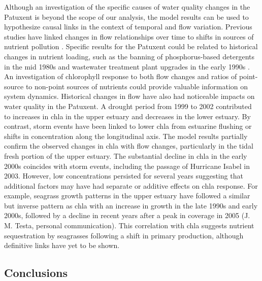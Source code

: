\documentclass[letterpaper,12pt,oneside]{article}\usepackage[]{graphicx}\usepackage[]{color}
\begin{document}
Although an investigation of the specific causes of water quality changes in the Patuxent is beyond the scope of our analysis, the model results can be used to hypothesize causal links in the context of temporal and flow variation.  Previous studies have linked changes in flow relationships over time to shifts in sources of nutrient pollution \citep{Hirsch10,Beck15}.  Specific results for the Patuxent could be related to historical changes in nutrient loading, such as the banning of phosphorus-based detergents in the mid 1980s and wastewater treatment plant upgrades in the early 1990s \citep{Lung03,Testa08a}.  An investigation of chlorophyll response to both flow changes and ratios of point-source to non-point sources of nutrients could provide valuable information on system dynamics.  Historical changes in flow have also had noticeable impacts on water quality in the Patuxent.  A drought period from 1999 to 2002 contributed to increases in \ac{chla} in the upper estuary and decreases in the lower estuary.  By contrast, storm events have been linked to lower \ac{chla} from estuarine flushing or shifts in concentration along the longitudinal axis.  The model results partially confirm the observed changes in \ac{chla} with flow changes, particularly in the tidal fresh portion of the upper estuary.  The substantial decline in \ac{chla} in the early 2000s coincides with storm events, including the passage of Hurricane Isabel in 2003.  However, low concentrations persisted for several years suggesting that additional factors may have had separate or additive effects on \ac{chla} response.  For example, seagrass growth patterns in the upper estuary have followed a similar but inverse pattern as \ac{chla} with an increase in growth in the late 1990s and early 2000s, followed by a decline in recent years after a peak in coverage in 2005 (J. M. Testa, personal communication).  This correlation with \ac{chla} suggests nutrient sequestration by seagrasses following a shift in primary production, although definitive links have yet to be shown.       

\subsection{Conclusions}
\end{document}
